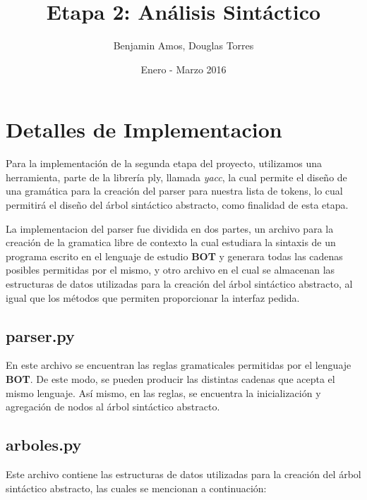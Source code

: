 \documentclass[a4paper, 10pt]{article}
\title{Etapa 2: Análisis Sintáctico}
\date{Enero - Marzo 2016}
\author{Benjamin Amos, Douglas Torres}
\begin{document}
	
	\maketitle
	\newpage
	
	\section{Detalles de Implementacion}
		
		\par	
		\medskip	
		Para la implementación de la segunda etapa del proyecto, utilizamos
		una herramienta, parte de la librería ply, llamada \textit{yacc}, la cual
		permite el diseño de una gramática para la creación del parser para nuestra
		lista de tokens, lo cual permitirá el diseño del árbol sintáctico abstracto, como
		finalidad de esta etapa.
		
		\par
		\medskip
		La implementacion del parser fue dividida en dos partes, un archivo para la creación
		de la gramatica libre de contexto la cual estudiara la sintaxis de un programa
		escrito en el lenguaje de estudio \textbf{BOT} y generara todas las cadenas posibles
		permitidas por el mismo, y otro archivo en el cual se almacenan las estructuras de datos
		utilizadas para la creación del árbol sintáctico abstracto, al igual que los métodos que permiten
		proporcionar la interfaz pedida.
		
		\subsection{parser.py}
		
			\par
			\medskip
			En este archivo se encuentran las reglas gramaticales permitidas por el lenguaje \textbf{BOT}.
			De este modo, se pueden producir las distintas cadenas que acepta el mismo lenguaje. Así mismo, 
			en las reglas, se encuentra la inicialización y agregación de nodos al árbol sintáctico abstracto.
			
		\subsection{arboles.py}
		
			\par
			\medskip
			Este archivo contiene las estructuras de datos utilizadas para la creación del árbol sintáctico 
			abstracto, las cuales se mencionan a continuación:
			
\end{document}
